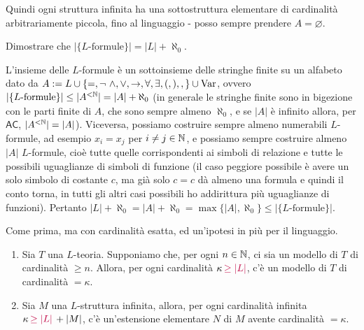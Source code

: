 Quindi ogni struttura infinita ha una sottostruttura elementare di cardinalità arbitrariamente piccola, fino al linguaggio - posso sempre prendere $A = \varnothing$.

\begin{exercise}
    Dimostrare che $|\{\text{$L$-formule}\}| = |L| + \aleph_0$.
\end{exercise}

\begin{soln}
    L'insieme delle $L$-formule è un sottoinsieme delle stringhe finite su un alfabeto dato da $A := L \cup \{=, \neg\,\, \land, \lor, \to, \forall, \exists, (, ), ,\} \cup \operatorname{Var}$, ovvero $|\{\text{$L$-formule}\}| \leq |A^{<\mathbb N}| = |A| + \aleph_0$ (in generale le stringhe finite sono in bigezione con le parti finite di $A$, che sono sempre almeno $\aleph_0$, e se $|A|$ è infinito allora, per $\mathsf{AC}$, $|A^{<\mathbb N}| = |A|$).
    Viceversa, possiamo costruire sempre almeno numerabili $L$-formule, ad esempio $x_i = x_j$ per $i \ne j \in \mathbb N$, e possiamo sempre costruire almeno $|A|$ $L$-formule, cioè tutte quelle corrispondenti ai simboli di relazione e tutte le possibili uguaglianze di simboli di funzione (il caso peggiore possibile è avere un solo simbolo di costante $c$, ma già solo $c = c$ dà almeno una formula e quindi il conto torna, in tutti gli altri casi possibili ho addirittura più uguaglianze di funzioni).
    Pertanto $|L| + \aleph_0 = |A| + \aleph_0 = \max\{|A|,\aleph_0\}\leq |\{\text{$L$-formule}\}|$.
\end{soln}

\begin{theorem}
    Come prima, ma con cardinalità esatta, ed un'ipotesi in più per il linguaggio.
    \begin{enumerate}
        \item Sia $T$ una $L$-teoria. Supponiamo che, per ogni $n \in \mathbb N$, ci sia un modello di $T$ di cardinalità $\geq n$. Allora, per ogni cardinalità $\kappa\, \textcolor{purple}{\geq |L|}$, c'è un modello di $T$ di cardinalità $= \kappa$.
        \item Sia $M$ una $L$-struttura infinita, allora, per ogni cardinalità infinita $\kappa \,\textcolor{purple}{\geq |L|}\, + |M|$, c'è un'estensione elementare $N$ di $M$ avente cardinalità $= \kappa$.
    \end{enumerate}
\end{theorem}

